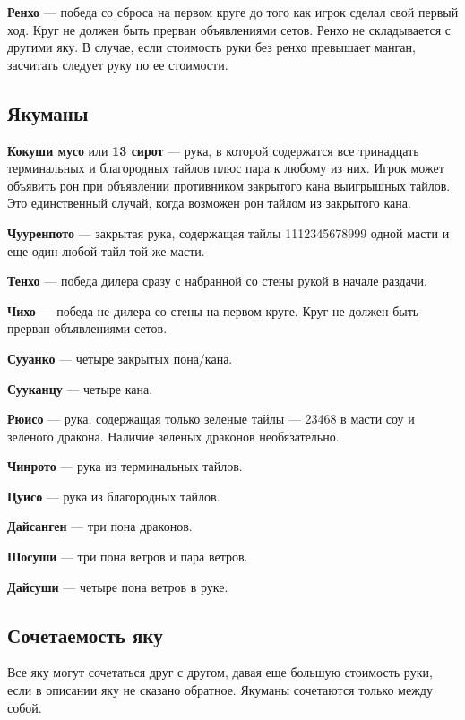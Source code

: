 \textbf{Ренхо} --- победа со сброса на первом круге до того как игрок сделал свой первый ход. Круг не должен быть прерван объявлениями сетов. Ренхо не складывается с другими яку. В случае, если стоимость руки без ренхо превышает манган, засчитать следует руку по ее стоимости.

\subsection{Якуманы}

\textbf{Кокуши мусо} или \textbf{13 сирот} --- рука, в которой содержатся все тринадцать терминальных и благородных тайлов плюс пара к любому из них. Игрок может объявить рон при объявлении противником закрытого кана выигрышных тайлов. Это единственный случай, когда возможен рон тайлом из закрытого кана.

\textbf{Чууренпото} --- закрытая рука, содержащая тайлы 1112345678999 одной масти и еще один любой тайл той же масти.

 \hfill {}

\textbf{Тенхо} --- победа дилера сразу с набранной со стены рукой в начале раздачи.

\textbf{Чихо} --- победа не-дилера со стены на первом круге. Круг не должен быть прерван объявлениями сетов.

\textbf{Сууанко} --- четыре закрытых пона/кана.

\textbf{Сууканцу} --- четыре кана.

\textbf{Рюисо} --- рука, содержащая только зеленые тайлы --- 23468 в масти соу и зеленого дракона. Наличие зеленых драконов необязательно.

 \textbf{Чинрото} --- рука из терминальных тайлов.

 \textbf{Цуисо} --- рука из благородных тайлов.

 \textbf{Дайсанген} --- три пона драконов.

\textbf{Шосуши} --- три пона ветров и пара ветров.

\textbf{Дайсуши} --- четыре пона ветров в руке.

\subsection{Сочетаемость яку}

Все яку могут сочетаться друг с другом, давая еще большую стоимость руки, если в описании яку не сказано обратное. Якуманы сочетаются только между собой.

